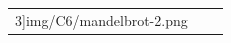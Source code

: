 \begin{figure}[ht]
\begin{tabular}{ccc}
3]{img/C6/mandelbrot-2.png} &   
\end{tabular}
\end{figure}
